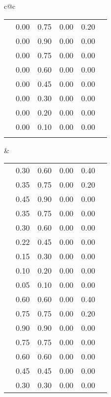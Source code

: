 \begin{footnotesize}
\begin{tabular}{c@{\quad}c}
\begin{tabular}{|c|c|cccc|}
\clrow{deepmagenta}             & 0.00 & 0.75 & 0.00 & 0.20 \\
\clrow{verydarkmagenta}         & 0.00 & 0.90 & 0.00 & 0.00 \\
\clrow{darkmagenta}             & 0.00 & 0.75 & 0.00 & 0.00 \\
\clrow{magenta}                 & 0.00 & 0.60 & 0.00 & 0.00 \\
\clrow{lightmagenta}            & 0.00 & 0.45 & 0.00 & 0.00 \\
\clrow{verylightmagenta}        & 0.00 & 0.30 & 0.00 & 0.00 \\
\clrow{palemagenta}             & 0.00 & 0.20 & 0.00 & 0.00 \\
\clrow{verypalemagenta}         & 0.00 & 0.10 & 0.00 & 0.00 \\
      \clspc
      \hline
    \end{tabular} 
   &
    \begin{tabular}{|c|c|cccc|} \hline
\clspc
\clrow{verydeepviolet}          & 0.30 & 0.60 & 0.00 & 0.40 \\
\clrow{deepviolet}              & 0.35 & 0.75 & 0.00 & 0.20 \\
\clrow{verydarkviolet}          & 0.45 & 0.90 & 0.00 & 0.00 \\
\clrow{darkviolet}              & 0.35 & 0.75 & 0.00 & 0.00 \\
\clrow{violet}                  & 0.30 & 0.60 & 0.00 & 0.00 \\
\clrow{lightviolet}             & 0.22 & 0.45 & 0.00 & 0.00 \\
\clrow{verylightviolet}         & 0.15 & 0.30 & 0.00 & 0.00 \\
\clrow{paleviolet}              & 0.10 & 0.20 & 0.00 & 0.00 \\
\clrow{verypaleviolet}          & 0.05 & 0.10 & 0.00 & 0.00 \\
\clspc
\clrow{verydeepblue}            & 0.60 & 0.60 & 0.00 & 0.40 \\
\clrow{deepblue}                & 0.75 & 0.75 & 0.00 & 0.20 \\
\clrow{verydarkblue}            & 0.90 & 0.90 & 0.00 & 0.00 \\
\clrow{darkblue}                & 0.75 & 0.75 & 0.00 & 0.00 \\
\clrow{blue}                    & 0.60 & 0.60 & 0.00 & 0.00 \\
\clrow{lightblue}               & 0.45 & 0.45 & 0.00 & 0.00 \\
\clrow{verylightblue}           & 0.30 & 0.30 & 0.00 & 0.00 \\

\end{tabular}
\end{tabular}
\end{footnotesize}
